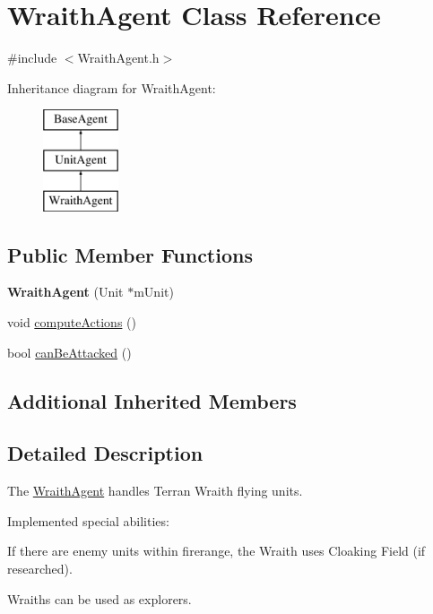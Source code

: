 \hypertarget{class_wraith_agent}{\section{Wraith\-Agent Class Reference}
\label{class_wraith_agent}
}


{\ttfamily \#include $<$Wraith\-Agent.\-h$>$}

Inheritance diagram for Wraith\-Agent\-:\begin{figure}[H]
\begin{center}
\leavevmode
\includegraphics[height=3.000000cm]{class_wraith_agent}
\end{center}
\end{figure}
\subsection*{Public Member Functions}
\begin{DoxyCompactItemize}
\item 
\hypertarget{class_wraith_agent_afc433cc29e6f6aceb332039290804ca6}{{\bfseries Wraith\-Agent} (Unit $\ast$m\-Unit)}\label{class_wraith_agent_afc433cc29e6f6aceb332039290804ca6}

\item 
void \hyperlink{class_wraith_agent_a37866613a9b2cadecaa45e38459e782c}{compute\-Actions} ()
\item 
bool \hyperlink{class_wraith_agent_abb74d889431272aa9d2e20c6e2bfe009}{can\-Be\-Attacked} ()
\end{DoxyCompactItemize}
\subsection*{Additional Inherited Members}


\subsection{Detailed Description}
The \hyperlink{class_wraith_agent}{Wraith\-Agent} handles Terran Wraith flying units.

Implemented special abilities\-:
\begin{DoxyItemize}
\item If there are enemy units within firerange, the Wraith uses Cloaking Field (if researched).
\item Wraiths can be used as explorers.
\end{DoxyItemize}

